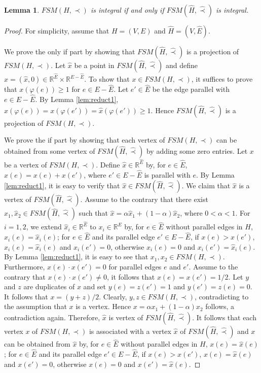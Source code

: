\documentclass[11pt]{article}
\newtheorem{lemma}[theorem]{Lemma}
\numberwithin{theorem}{section}
\begin{document}
\begin{lemma}
\label{lem:reduct4}
$FSM(H,\prec)$ is integral if and only if $FSM(\hat{H},\hat\prec)$ is integral.
\end{lemma}
\begin{proof}
For simplicity, assume that $H=(V,E)$ and $\hat{H}=(V,\hat{E})$.

We prove the only if part by showing that $FSM(\hat{H},\hat\prec)$ is a projection of $FSM(H,\prec)$. 
Let $\hat{x}$ be a point in $FSM(\hat{H},\hat\prec)$ and define $x=(\hat{x},0)\in \mathbb{R}^{\hat{E}}\times \mathbb{R}^{E-\hat{E}}$. To show that $x\in FSM(H,\prec)$, it suffices to prove that $x(\varphi(e))\geq 1$ for $e\in E-\hat{E}$. Let $e'\in \hat{E}$ be the edge parallel with $e\in E-\hat{E}$. By Lemma \ref{lem:reduct1}, $x(\varphi(e))=x(\varphi(e'))=\hat{x}(\varphi(e'))\geq 1$. Hence $FSM(\hat{H},\hat\prec)$ is a projection of $FSM(H,\prec)$.

We prove the if part by showing that each vertex of $FSM(H,\prec)$ can be obtained from some vertex of $FSM(\hat{H},\hat\prec)$ by adding some zero entries. Let $x$ be a vertex of $FSM(H,\prec)$. Define $\hat{x}\in \mathbb{R}^{\hat{E}}$ by, for $e\in \hat{E}$, $\hat{x}(e)=x(e)+x(e')$, where $e'\in E-\hat{E}$ is parallel with $e$. By Lemma \ref{lem:reduct1}, it is easy to verify that $\hat{x}\in FSM(\hat{H},\hat\prec)$. We claim that $\hat{x}$ is a vertex of $FSM(\hat{H},\hat\prec)$. Assume to the contrary that there exist $\hat{x}_1, \hat{x}_2 \in FSM(\hat{H},\hat\prec)$ such that $\hat{x}=\alpha \hat{x}_1+ (1-\alpha)\hat{x}_2$, where $0<\alpha<1$. For $i=1,2$, we extend $\hat{x}_i\in \mathbb{R}^{\hat{E}}$ to $x_i\in \mathbb{R}^{E}$ by, for $e\in \hat{E}$ without parallel edges in $H$, $x_i(e)=\hat{x}_i(e)$; for $e\in\hat{E}$ and its parallel edge $e'\in E-\hat{E}$, if $x(e)>x(e')$, $x_i(e)=\hat{x}_i(e)$ and $x_i(e')=0$, otherwise $x_i(e)=0$ and $x_i(e')=\hat{x}_i(e)$. By Lemma \ref{lem:reduct1}, it is easy to see that $x_1,x_2\in FSM(H,\prec)$. Furthermore, $x(e)\cdot x(e')=0$ for parallel edges $e$ and $e'$. Assume to the contrary that $x(e)\cdot x(e')\not=0$, it follows that $x(e)=x(e')=1/2$. Let $y$ and $z$ are duplicates of $x$ and set $y (e)=z(e')=1$ and $y (e')=z(e)=0$. It follows that $x= (y + z)/2$. Clearly, $y,z\in FSM(H,\prec)$, contradicting to the assumption that $x$ is a vertex.
Hence $x=\alpha x_1+(1-\alpha) x_2$ follows, a contradiction again. Therefore, $\hat{x}$ is vertex of $FSM(\hat{H},\hat\prec)$. It follows that each vertex $x$ of $FSM(H,\prec)$ is associated with a vertex $\hat{x}$ of $FSM(\hat{H},\hat\prec)$ and $x$ can be obtained from $\hat{x}$ by, for $e\in \hat{E}$ without parallel edges in $H$, $x(e)=\hat{x}(e)$; for $e\in\hat{E}$ and its parallel edge $e'\in E-\hat{E}$, if $x(e)>x(e')$, $x(e)=\hat{x}(e)$ and $x(e')=0$, otherwise $x(e)=0$ and $x(e')=\hat{x}(e)$. 
\end{proof}
\end{document}
